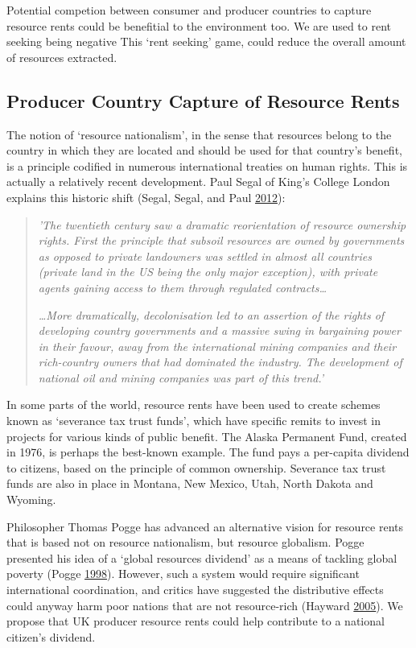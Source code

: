 \documentclass[]{tufte-handout}
\begin{document}
Potential competion between consumer and producer countries to capture
resource rents could be benefitial to the environment too. We are used
to rent seeking being negative This `rent seeking' game, could reduce
the overall amount of resources extracted.

\hypertarget{producer-country-capture-of-resource-rents}{%
\subsection{Producer Country Capture of Resource
Rents}\label{producer-country-capture-of-resource-rents}}

The notion of `resource nationalism', in the sense that resources belong
to the country in which they are located and should be used for that
country's benefit, is a principle codified in numerous international
treaties on human rights. This is actually a relatively recent
development. Paul Segal of King's College London explains this historic
shift (Segal, Segal, and Paul \protect\hyperlink{ref-Segal2012}{2012}):

\begin{quote}
\emph{'The twentieth century saw a dramatic reorientation of resource
ownership rights. First the principle that subsoil resources are owned
by governments as opposed to private landowners was settled in almost
all countries (private land in the US being the only major exception),
with private agents gaining access to them through regulated
contracts\ldots{}}

\emph{\ldots{}More dramatically, decolonisation led to an assertion of
the rights of developing country governments and a massive swing in
bargaining power in their favour, away from the international mining
companies and their rich-country owners that had dominated the industry.
The development of national oil and mining companies was part of this
trend.'}
\end{quote}

In some parts of the world, resource rents have been used to create
schemes known as `severance tax trust funds', which have specific remits
to invest in projects for various kinds of public benefit. The Alaska
Permanent Fund, created in 1976, is perhaps the best-known example. The
fund pays a per-capita dividend to citizens, based on the principle of
common ownership. Severance tax trust funds are also in place in
Montana, New Mexico, Utah, North Dakota and Wyoming.

Philosopher Thomas Pogge has advanced an alternative vision for resource
rents that is based not on resource nationalism, but resource globalism.
Pogge presented his idea of a `global resources dividend' as a means of
tackling global poverty (Pogge \protect\hyperlink{ref-Pogge1998}{1998}).
However, such a system would require significant international
coordination, and critics have suggested the distributive effects could
anyway harm poor nations that are not resource-rich (Hayward
\protect\hyperlink{ref-Hayward2005}{2005}). We propose that UK producer
resource rents could help contribute to a national citizen's dividend.
\end{document}
